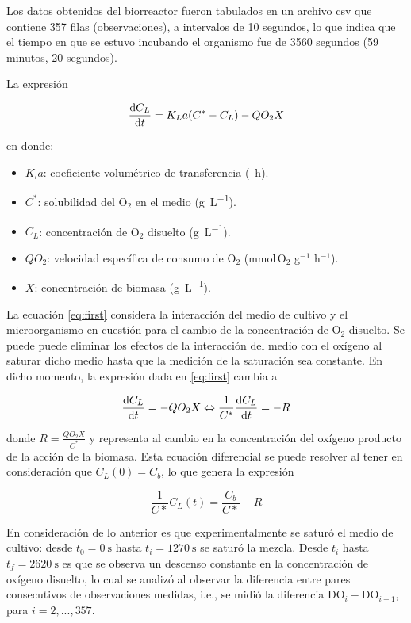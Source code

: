 Los datos obtenidos del biorreactor fueron tabulados en un archivo csv que contiene 357 filas (observaciones), a intervalos de 10 segundos, lo que indica que el tiempo en que se estuvo incubando el organismo fue de 3560 segundos (59 minutos, 20 segundos). 

La expresión 

\begin{equation}
  \dv{C_L}{t} = K_La(C^* - C_L) - QO_2X
  \label{eq:first}
\end{equation}

en donde:

\begin{itemize}
  \item $K_la$: coeficiente volumétrico de transferencia (\si{\per\hour}). 
  \item $C^*$: solubilidad del O$_2$ en el medio (\si{\g\per\L}).
  \item $C_L$: concentración de O$_2$ disuelto (\si{\g\per\L}).
  \item $QO_2$: velocidad específica de consumo de O$_2$ (mmol$\,$O$_2$ g$^{-1}$ h$^{-1}$).
  \item $X$: concentración de biomasa (\si{\g\per\L}).
\end{itemize}

La ecuación \eqref{eq:first} considera la interacción del medio de cultivo y el microorganismo en cuestión para el cambio de la concentración de O$_2$ disuelto. Se puede puede eliminar los efectos de la interacción del medio con el oxígeno al saturar dicho medio hasta que la medición de la saturación sea constante. En dicho momento, la expresión dada en \eqref{eq:first} cambia a

\begin{equation}
  \dv{C_L}{t} = -QO_2X \Leftrightarrow \frac{1}{C^*}\dv{C_L}{t} = -R
  \label{eq:second}
\end{equation}

donde $R = \frac{QO_2X}{C^*}$ y representa al cambio en la concentración del oxígeno producto de la acción de la biomasa. Esta ecuación diferencial se puede resolver al tener en consideración que $C_L(0) = C_b$, lo que genera la expresión

\begin{equation}
  \frac{1}{C*}C_L(t) = \frac{C_b}{C*} - R
  \label{eq:third}
\end{equation}

En consideración de lo anterior es que experimentalmente se saturó el medio de cultivo: desde $t_0=\SI{0}{\s}$ hasta $t_i=\SI{1270}{\s}$ se saturó la mezcla. Desde $t_i$ hasta $t_f=\SI{2620}{\s}$ es que se observa un descenso constante en la concentración de oxígeno disuelto, lo cual se analizó al observar la diferencia entre pares consecutivos de observaciones medidas, i.e., se midió la diferencia DO$_{i}-$DO$_{i-1}$, para $i=2,...,357$.

